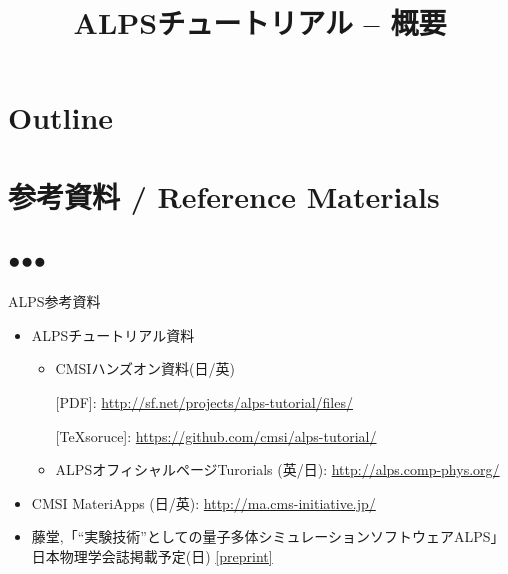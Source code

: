 
\title{ALPSチュートリアル -- 概要}




\begin{frame}
  \titlepage
\end{frame}

\section*{Outline}
\begin{frame}[t,fragile]
  \tableofcontents
\end{frame}

\section{参考資料 / Reference Materials}
\subsection*{{\protect\color{red}●}{\protect\color{blue}●}{\protect\color{green}●}}

\begin{frame}[t,fragile]{ALPS参考資料}
  \begin{itemize}
    \setlength{\itemsep}{1em}
  \item ALPSチュートリアル資料
    \begin{itemize}
    \item CMSIハンズオン資料(日/英)
      
      [PDF]: {\footnotesize \url{http://sf.net/projects/alps-tutorial/files/}}
      
      [\TeX soruce]: {\footnotesize \url{https://github.com/cmsi/alps-tutorial/}}
      
    \item ALPSオフィシャルページTurorials (英/日): {\footnotesize \url{http://alps.comp-phys.org/}}
    \end{itemize}
  \item CMSI MateriApps (日/英): {\footnotesize \url{http://ma.cms-initiative.jp/}}
  \item 藤堂,「``実験技術''としての量子多体シミュレーションソフトウェアALPS」日本物理学会誌掲載予定(日) \href{http://exa.phys.s.u-tokyo.ac.jp/archive/alps-jps-2015.pdf}{\footnotesize [preprint]}
  \end{itemize}
\end{frame}

